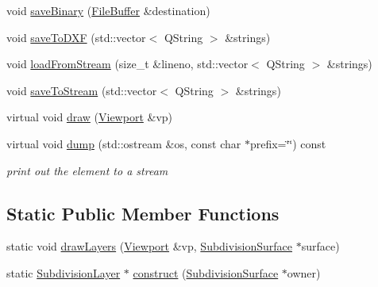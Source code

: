\begin{DoxyCompactItemize}
\item 
void \hyperlink{classShipCADGeometry_1_1SubdivisionLayer_a35b72f27a1d354dcc6f3b844687d91e8}{save\-Binary} (\hyperlink{classShipCADGeometry_1_1FileBuffer}{File\-Buffer} \&destination)
\item 
void \hyperlink{classShipCADGeometry_1_1SubdivisionLayer_ac4e18cba13ce798c2ca89f07c443b09b}{save\-To\-D\-X\-F} (std\-::vector$<$ Q\-String $>$ \&strings)
\item 
void \hyperlink{classShipCADGeometry_1_1SubdivisionLayer_af86299eea0a5a472d1edfae2706e335a}{load\-From\-Stream} (size\-\_\-t \&lineno, std\-::vector$<$ Q\-String $>$ \&strings)
\item 
void \hyperlink{classShipCADGeometry_1_1SubdivisionLayer_a502c7889a73015d4295fb922c92c78be}{save\-To\-Stream} (std\-::vector$<$ Q\-String $>$ \&strings)
\item 
virtual void \hyperlink{classShipCADGeometry_1_1SubdivisionLayer_a86f8600ffbf3973bc31c99bdb9e5b18d}{draw} (\hyperlink{classShipCADGeometry_1_1Viewport}{Viewport} \&vp)
\item 
virtual void \hyperlink{classShipCADGeometry_1_1SubdivisionLayer_ab41e005f720a2bba4b2efa74bfd5943e}{dump} (std\-::ostream \&os, const char $\ast$prefix=\char`\"{}\char`\"{}) const 
\begin{DoxyCompactList}\small\item\em print out the element to a stream \end{DoxyCompactList}\end{DoxyCompactItemize}
\subsection*{Static Public Member Functions}
\begin{DoxyCompactItemize}
\item 
static void \hyperlink{classShipCADGeometry_1_1SubdivisionLayer_a838537201ca31bc92a38585c87eb56e9}{draw\-Layers} (\hyperlink{classShipCADGeometry_1_1Viewport}{Viewport} \&vp, \hyperlink{classShipCADGeometry_1_1SubdivisionSurface}{Subdivision\-Surface} $\ast$surface)
\item 
static \hyperlink{classShipCADGeometry_1_1SubdivisionLayer}{Subdivision\-Layer} $\ast$ \hyperlink{classShipCADGeometry_1_1SubdivisionLayer_a7d41b9d0ff65032014ec52ff846f32a7}{construct} (\hyperlink{classShipCADGeometry_1_1SubdivisionSurface}{Subdivision\-Surface} $\ast$owner)
\end{DoxyCompactItemize}
